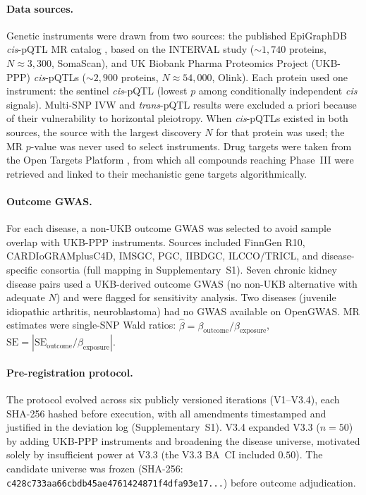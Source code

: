 \documentclass[11pt]{article}
\begin{document}
\paragraph{Data sources.}
Genetic instruments were drawn from two sources: the published EpiGraphDB \emph{cis}-pQTL MR catalog \cite{zheng2020phenome}, based on the INTERVAL study (${\sim}1{,}740$ proteins, $N \approx 3{,}300$, SomaScan), and UK Biobank Pharma Proteomics Project (UKB-PPP) \emph{cis}-pQTLs (${\sim}2{,}900$ proteins, $N \approx 54{,}000$, Olink). Each protein used one instrument: the sentinel \emph{cis}-pQTL (lowest $p$ among conditionally independent \emph{cis} signals). Multi-SNP IVW and \emph{trans}-pQTL results were excluded a priori because of their vulnerability to horizontal pleiotropy. When \emph{cis}-pQTLs existed in both sources, the source with the largest discovery $N$ for that protein was used; the MR $p$-value was never used to select instruments. Drug targets were taken from the Open Targets Platform \cite{ochoa2021opentargets}, from which all compounds reaching Phase~III were retrieved and linked to their mechanistic gene targets algorithmically.

\paragraph{Outcome GWAS.}
For each disease, a non-UKB outcome GWAS was selected to avoid sample overlap with UKB-PPP instruments. Sources included FinnGen R10, CARDIoGRAMplusC4D, IMSGC, PGC, IIBDGC, ILCCO/TRICL, and disease-specific consortia (full mapping in Supplementary~S1). Seven chronic kidney disease pairs used a UKB-derived outcome GWAS (no non-UKB alternative with adequate $N$) and were flagged for sensitivity analysis. Two diseases (juvenile idiopathic arthritis, neuroblastoma) had no GWAS available on OpenGWAS. MR estimates were single-SNP Wald ratios: $\hat{\beta} = \beta_{\text{outcome}} / \beta_{\text{exposure}}$, $\text{SE} = |\text{SE}_{\text{outcome}} / \beta_{\text{exposure}}|$.

\paragraph{Pre-registration protocol.}
The protocol evolved across six publicly versioned iterations (V1--V3.4), each SHA-256 hashed before execution, with all amendments timestamped and justified in the deviation log (Supplementary~S1). V3.4 expanded V3.3 ($n = 50$) by adding UKB-PPP instruments and broadening the disease universe, motivated solely by insufficient power at V3.3 (the V3.3 BA~CI included $0.50$). The candidate universe was frozen (SHA-256: \texttt{c428c733aa66cb\-db45ae4761\-424871f4\-dfa93e17\allowbreak...}) before outcome adjudication.
\end{document}
